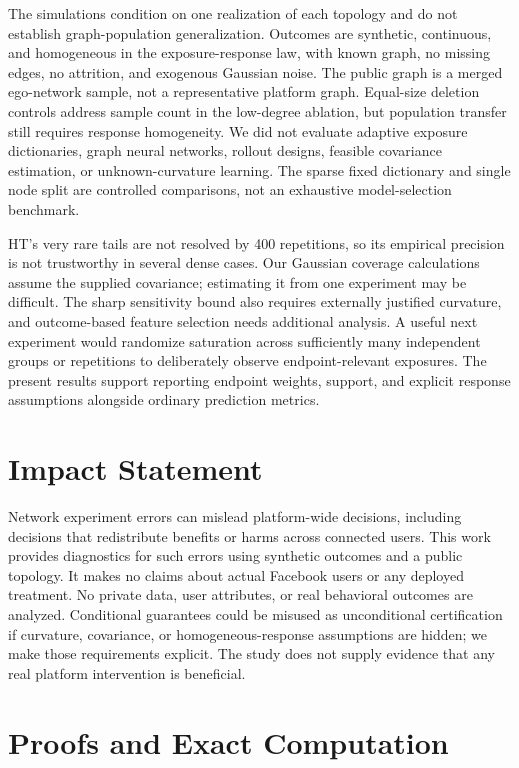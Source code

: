\documentclass{article}
\begin{document}
The simulations condition on one realization of each topology and do not establish graph-population generalization. Outcomes are synthetic, continuous, and homogeneous in the exposure-response law, with known graph, no missing edges, no attrition, and exogenous Gaussian noise. The public graph is a merged ego-network sample, not a representative platform graph. Equal-size deletion controls address sample count in the low-degree ablation, but population transfer still requires response homogeneity. We did not evaluate adaptive exposure dictionaries, graph neural networks, rollout designs, feasible covariance estimation, or unknown-curvature learning. The sparse fixed dictionary and single node split are controlled comparisons, not an exhaustive model-selection benchmark.

HT's very rare tails are not resolved by 400 repetitions, so its empirical precision is not trustworthy in several dense cases. Our Gaussian coverage calculations assume the supplied covariance; estimating it from one experiment may be difficult. The sharp sensitivity bound also requires externally justified curvature, and outcome-based feature selection needs additional analysis. A useful next experiment would randomize saturation across sufficiently many independent groups or repetitions to deliberately observe endpoint-relevant exposures. The present results support reporting endpoint weights, support, and explicit response assumptions alongside ordinary prediction metrics.

\clearpage
\section*{Impact Statement}
Network experiment errors can mislead platform-wide decisions, including decisions that redistribute benefits or harms across connected users. This work provides diagnostics for such errors using synthetic outcomes and a public topology. It makes no claims about actual Facebook users or any deployed treatment. No private data, user attributes, or real behavioral outcomes are analyzed. Conditional guarantees could be misused as unconditional certification if curvature, covariance, or homogeneous-response assumptions are hidden; we make those requirements explicit. The study does not supply evidence that any real platform intervention is beneficial.




\clearpage
\appendix
\onecolumn
\section{Proofs and Exact Computation}\label{app:proofs}
\end{document}
